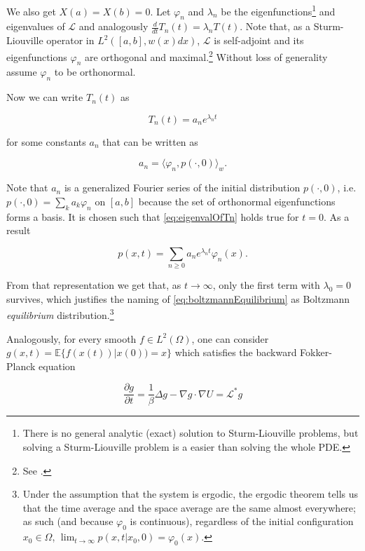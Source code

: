 We also get $X(a)=X(b)=0$. Let $\varphi_n$ and $\lambda_n$ be the eigenfunctions\footnote{There is no general analytic (exact) solution to Sturm-Liouville problems, but solving a Sturm-Liouville problem is a easier than solving the whole PDE.} and eigenvalues of $\mathcal{L}$ and analogously $\frac{d}{dt}T_n(t)=\lambda_n T(t)$. Note that, as a Sturm-Liouville operator in $L^2([a,b], w(x)dx)$, $\mathcal{L}$ is self-adjoint and its eigenfunctions $\varphi_n$ are orthogonal and maximal.\footnote{See \cite{Teschl2012}.} Without loss of generality assume $\varphi_n$ to be orthonormal.

Now we can write $T_n(t)$ as

\begin{equation}\label{eq:eigenvalOfTn}
T_n(t) = a_n e^{\lambda_n t}
\end{equation}

for some constants $a_n$ that can be written as

\begin{equation*}
a_n = \langle \varphi_n, p(\cdot, 0) \rangle_w.
\end{equation*}

Note that $a_n$ is a generalized Fourier series of the initial distribution $p(\cdot, 0)$, i.e. $p(\cdot, 0) = \sum_k a_k \varphi_n$ on $[a,b]$ because the set of orthonormal eigenfunctions forms a basis. It is chosen such that \eqref{eq:eigenvalOfTn} holds true for $t=0$. As a result

\begin{equation}\label{eq:decompositionProbDistributionfFPO}
p(x,t) = \sum_{n\geq 0} a_n e^{\lambda_n t} \varphi_n(x).
\end{equation}

From that representation we get that, as $t\rightarrow \infty$, only the first term with $\lambda_0 = 0$ survives, which justifies the naming of \eqref{eq:boltzmannEquilibrium} as Boltzmann \textit{equilibrium} distribution.\footnote{Under the assumption that the system is ergodic, the ergodic theorem tells us that the time average and the space average are the same almost everywhere; as such (and because $\varphi_0$ is continuous), regardless of the initial configuration $x_0\in\Omega$, $\lim_{t\rightarrow\infty} p(x,t | x_0, 0) = \varphi_0(x)$.}

Analogously, for every smooth $f\in L^2(\Omega)$, one can consider $g(x,t) = \mathbb{E}\{f(x(t)) | x(0) ) = x \}$ which satisfies the backward Fokker-Planck equation

\begin{equation*}
\frac{\partial g}{\partial t} = \frac{1}{\beta}\Delta g - \nabla g \cdot\nabla U = \mathcal{L}^*g
\end{equation*}

